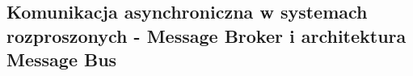 \subsection*{Komunikacja asynchroniczna w systemach rozproszonych - Message Broker i architektura Message Bus}